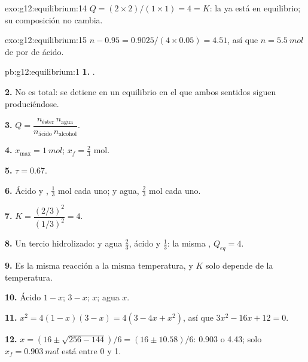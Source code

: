\begin{solution}{exo:g12:equilibrium:14}
$Q = (2 \times 2)/(1 \times 1) = 4 = K$: la  ya está en
equilibrio; su composición no cambia.
\end{solution}

\begin{solution}{exo:g12:equilibrium:15}
$n - 0.95 = 0.9025 / (4 \times 0.05) = 4.51$, así que $n = \qty{5.5}{mol}$
de  por  de ácido.
\end{solution}

\begin{solution}{pb:g12:equilibrium:1}
\textbf{1.} .

\textbf{2.} No es total: se detiene en un equilibrio en el que ambos
sentidos siguen produciéndose.

\textbf{3.} $Q = \dfrac{n_{\text{éster}}\, n_{\text{agua}}}{n_{\text{ácido}}\, n_{\text{alcohol}}}$.

\textbf{4.} $x_{\max} = \qty{1}{mol}$; $x_f = \frac{2}{3}$ mol.

\textbf{5.} $\tau = 0.67$.

\textbf{6.} Ácido y , $\frac{1}{3}$ mol cada uno;  y agua,
$\frac{2}{3}$ mol cada uno.

\textbf{7.} $K = \dfrac{(2/3)^2}{(1/3)^2} = 4$.

\textbf{8.} Un tercio hidrolizado:  y agua $\frac{2}{3}$, ácido y
 $\frac{1}{3}$: la misma , $Q_{eq} = 4$.

\textbf{9.} Es la misma reacción a la misma temperatura, y $K$ solo
depende de la temperatura.

\textbf{10.} Ácido $1 - x$;  $3 - x$;  $x$; agua $x$.

\textbf{11.} $x^2 = 4(1 - x)(3 - x) = 4(3 - 4x + x^2)$, así que
$3x^2 - 16x + 12 = 0$.

\textbf{12.} $x = (16 \pm \sqrt{256 - 144})/6 = (16 \pm 10.58)/6$: 0.903
o 4.43; solo $x_f = \qty{0.903}{mol}$ está entre 0 y 1.


\end{solution}
